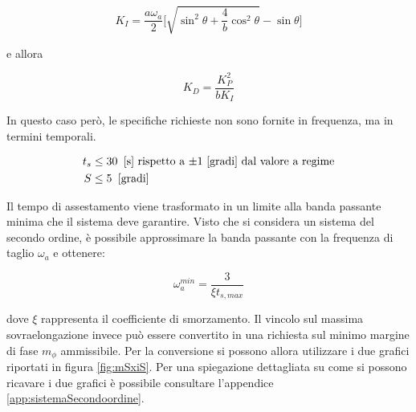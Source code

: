 		\begin{equation}
			K_I=\frac{a\omega_a}{2}\Biggl[\sqrt{\sin^2\theta+\frac{4}{b}\cos^2\theta}-\sin\theta\Biggl]
		\end{equation}
		
		\noindent e allora
		
		\begin{equation}
			K_D=\frac{K_P^2}{bK_I}
		\end{equation}
		
		\noindent In questo caso però, le specifiche richieste non sono fornite in frequenza, ma in termini temporali. 
		
		\begin{align}
			t_s &\le 30 \singleSpacing \textrm{[s] rispetto a $\pm1$ [gradi] dal valore a regime} \\
			S   &\le 5 \singleSpacing \textrm{[gradi]}
		\end{align}
		
		\noindent Il tempo di assestamento viene trasformato in un limite alla banda passante minima che il sistema deve garantire. Visto che si considera un sistema del secondo ordine, è possibile approssimare la banda passante con la frequenza di taglio $\omega_a$ e ottenere:
		
		\begin{equation}
			\omega_a^{min}= \frac{3}{\xi t_{s,max}}
		\end{equation}
		
		\noindent dove $\xi$ rappresenta il coefficiente di smorzamento. Il vincolo sul massima sovraelongazione invece può essere convertito in una richiesta sul minimo margine di fase $m_{\phi}$ ammissibile. Per la conversione si possono allora utilizzare i due grafici riportati in figura \ref{fig:mSxiS}. Per una spiegazione dettagliata su come si possono ricavare i due grafici è possibile consultare l'appendice \ref{app:sistemaSecondoordine}.
		
